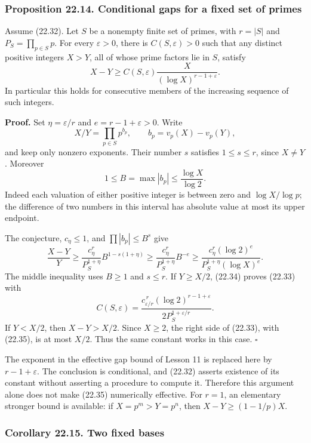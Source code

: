 \documentclass[
  11pt,
  a4paper,
]{article}
\newcounter{none} %
\begin{document}
\subsubsection{Proposition 22.14. Conditional gaps for a fixed set of
primes}\label{proposition-22.14.-conditional-gaps-for-a-fixed-set-of-primes}

Assume (22.32). Let \(S\) be a nonempty finite set of primes, with
\(r=|S|\) and \(P_S=\prod_{p\in S}p\). For every \(\varepsilon>0\),
there is \(C(S,\varepsilon)>0\) such that any distinct positive integers
\(X>Y\), all of whose prime factors lie in \(S\), satisfy \[
 X-Y\ge C(S,\varepsilon)
       \frac{X}{(\log X)^{r-1+\varepsilon}}.
 \tag{22.33}
\] In particular this holds for consecutive members of the increasing
sequence of such integers.

\textbf{Proof.} Set \(\eta=\varepsilon/r\) and \(e=r-1+\varepsilon>0\).
Write \[
 X/Y=\prod_{p\in S}p^{b_p},\qquad b_p=v_p(X)-v_p(Y),
\] and keep only nonzero exponents. Their number \(s\) satisfies
\(1\le s\le r\), since \(X\ne Y\). Moreover \[
 1\le B=\max|b_p|\le\frac{\log X}{\log2}.
\] Indeed each valuation of either positive integer is between zero and
\(\log X/\log p\); the difference of two numbers in this interval has
absolute value at most its upper endpoint.

The conjecture, \(c_\eta\le1\), and \(\prod|b_p|\le B^s\) give \[
 \frac{X-Y}{Y}
 \ge \frac{c_\eta^r}{P_S^{1+\eta}}
          B^{1-s(1+\eta)}
 \ge \frac{c_\eta^r}{P_S^{1+\eta}}B^{-e}
 \ge \frac{c_\eta^r(\log2)^e}
           {P_S^{1+\eta}(\log X)^e}.
 \tag{22.34}
\] The middle inequality uses \(B\ge1\) and \(s\le r\). If \(Y\ge X/2\),
(22.34) proves (22.33) with \[
 C(S,\varepsilon)=
 \frac{c_{\varepsilon/r}^{\,r}(\log2)^{r-1+\varepsilon}}
      {2P_S^{1+\varepsilon/r}}.
 \tag{22.35}
\] If \(Y<X/2\), then \(X-Y>X/2\). Since \(X\ge2\), the right side of
(22.33), with (22.35), is at most \(X/2\). Thus the same constant works
in this case. \(\square\)

The exponent in the effective gap bound of Lesson 11 is replaced here by
\(r-1+\varepsilon\). The conclusion is conditional, and (22.32) asserts
existence of its constant without asserting a procedure to compute it.
Therefore this argument alone does not make (22.35) numerically
effective. For \(r=1\), an elementary stronger bound is available: if
\(X=p^m>Y=p^n\), then \(X-Y\ge(1-1/p)X\).

\subsubsection{Corollary 22.15. Two fixed
bases}\label{corollary-22.15.-two-fixed-bases}
\end{document}
